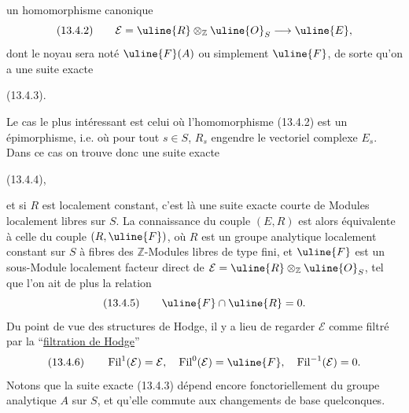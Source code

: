 un homomorphisme canonique
\[
(13.4.2)\qquad\mathcal E=\uline{R}\otimes_{\mathbb Z}\uline{O}_S\longrightarrow\uline{E},
\]
dont le noyau sera noté $\uline{F}(A)$ ou simplement $\uline{F}$, de sorte qu'on a une suite exacte

(13.4.3)\quad{}.

Le cas le plus intéressant est celui où l'homomorphisme (13.4.2) est un épimorphisme, i.e. où pour tout $s\in S$, $R_s$ engendre le vectoriel complexe $E_s$. Dans ce cas on trouve donc une suite exacte

(13.4.4)\quad{},

et si $R$ est localement constant, c'est là une suite exacte courte de Modules localement libres sur $S$. La connaissance du couple $(E,R)$ est alors équivalente à celle du couple $(R,\uline{F})$, où $R$ est un groupe analytique localement constant sur $S$ à fibres des $\mathbb Z$-Modules libres de type fini, et $\uline{F}$ est un sous-Module localement facteur direct de $\mathcal E=\uline{R}\otimes_{\mathbb Z}\uline{O}_S$, tel que l'on ait de plus la relation
\[
(13.4.5)\qquad\uline{F}\cap\uline{R}=0.
\]
Du point de vue des structures de Hodge, il y a lieu de regarder $\mathcal E$ comme filtré par la ``\uline{filtration de Hodge}''
\[
(13.4.6)\qquad\operatorname{Fil}^1(\mathcal E)=\mathcal E,\quad\operatorname{Fil}^0(\mathcal E)=\uline{F},\quad\operatorname{Fil}^{-1}(\mathcal E)=0.
\]
Notons que la suite exacte (13.4.3) dépend encore fonctoriellement du groupe analytique $A$ sur $S$, et qu'elle commute aux changements de base quelconques.
